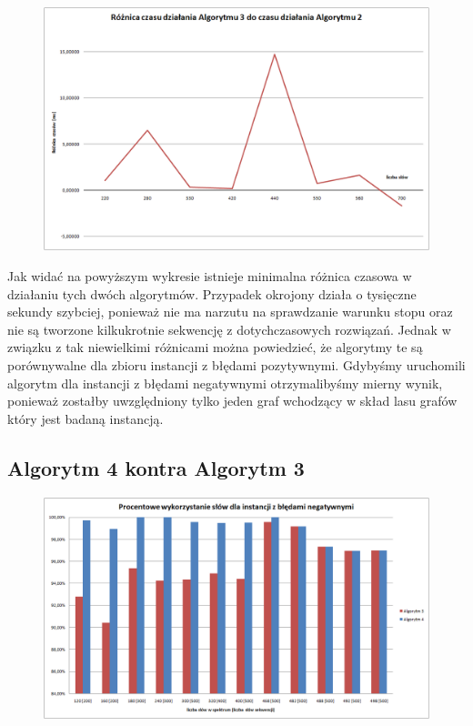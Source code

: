 \documentclass[a4paper,10pt]{article}
\begin{document}
\begin{figure}[h]
  \footnotesize\centering
  \includegraphics[width=\textwidth,keepaspectratio]{timeDiff_general_vs_positive.png}
\end{figure}

Jak widać na powyższym wykresie istnieje minimalna różnica czasowa w działaniu tych dwóch algorytmów. Przypadek okrojony działa o tysięczne sekundy szybciej, ponieważ nie ma narzutu na sprawdzanie warunku stopu oraz nie są tworzone kilkukrotnie sekwencję z dotychczasowych rozwiązań. Jednak w związku z tak niewielkimi różnicami można powiedzieć, że algorytmy te są porównywalne dla zbioru instancji z błędami pozytywnymi.
Gdybyśmy uruchomili algorytm dla instancji z błędami negatywnymi otrzymalibyśmy mierny wynik, ponieważ zostałby uwzględniony tylko jeden graf wchodzący w skład lasu grafów który jest badaną instancją.

\subsection{Algorytm 4 kontra Algorytm 3}

\begin{figure}[h]
  \footnotesize\centering
  \includegraphics[width=\textwidth,keepaspectratio]{percentageUsedWords_general_vs_negative.png}
\end{figure}
\end{document}
